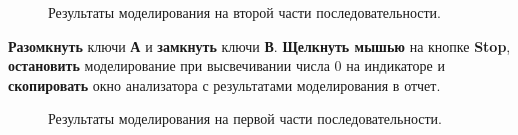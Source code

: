 \documentclass[spec, och, otchet, hidelinks]{SCWorks}
\begin{document}
\begin{figure}[h!]
	\caption{Результаты моделирования на второй части последовательности.}
\end{figure}

\newpage

\textbf{Разомкнуть} ключи \textbf{А} и \textbf{замкнуть} ключи \textbf{В}. \textbf{Щелкнуть мышью} на кнопке \textbf{Stop}, \textbf{остановить} 
моделирование при высвечивании числа 0 на индикаторе и \textbf{скопировать} окно анализатора с результатами моделирования в отчет.

\begin{figure}[h]
	\caption{Результаты моделирования на первой части последовательности.}
\end{figure}
\end{document}
